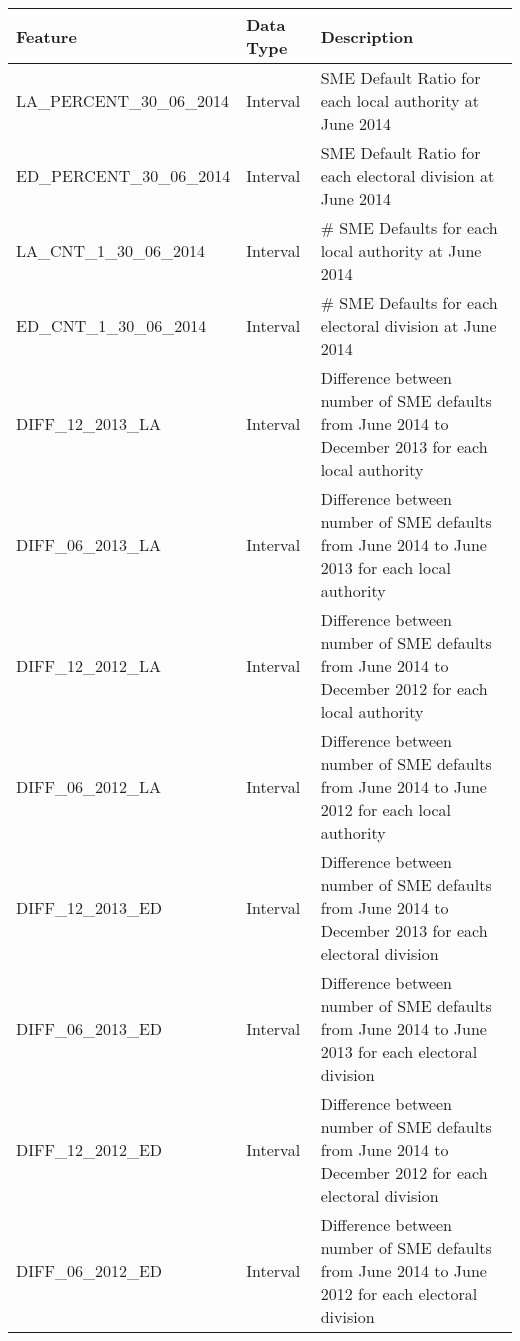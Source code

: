 \begin{table}[H]
	\centering
	\resizebox{\textwidth}{!}
	{
		\begin{tabular}{|l|l|l|}
			\hline
			\textbf{Feature} & \textbf{Data Type} & \textbf{Description}                                                                                                                                                                                                                                                                                                                                                                                                                                                                                                                              \\ \hline
			LA\_PERCENT\_30\_06\_2014 & Interval & SME Default Ratio for each local authority at June 2014 \\ \hline
			ED\_PERCENT\_30\_06\_2014 & Interval & SME Default Ratio for each electoral division at June 2014 \\ \hline
			LA\_CNT\_1\_30\_06\_2014 & Interval & \# SME Defaults for each local authority at June 2014 \\ \hline
			ED\_CNT\_1\_30\_06\_2014 & Interval & \# SME Defaults for each electoral division at June 2014\\ \hline
			DIFF\_12\_2013\_LA & Interval & Difference between number of SME defaults from June 2014 to December 2013 for each local authority \\ \hline
			DIFF\_06\_2013\_LA & Interval & Difference between number of SME defaults from June 2014 to June 2013 for each local authority \\ \hline
			DIFF\_12\_2012\_LA & Interval & Difference between number of SME defaults from June 2014 to December 2012 for each local authority \\ \hline
			DIFF\_06\_2012\_LA & Interval & Difference between number of SME defaults from June 2014 to June 2012 for each local authority \\ \hline
			
			DIFF\_12\_2013\_ED & Interval & Difference between number of SME defaults from June 2014 to December 2013 for each electoral division \\ \hline
			DIFF\_06\_2013\_ED & Interval & Difference between number of SME defaults from June 2014 to June 2013 for each electoral division \\ \hline
			DIFF\_12\_2012\_ED & Interval & Difference between number of SME defaults from June 2014 to December 2012 for each electoral division \\ \hline
			DIFF\_06\_2012\_ED & Interval & Difference between number of SME defaults from June 2014 to June 2012 for each electoral division \\ \hline
			

\end{tabular}}
\end{table}
